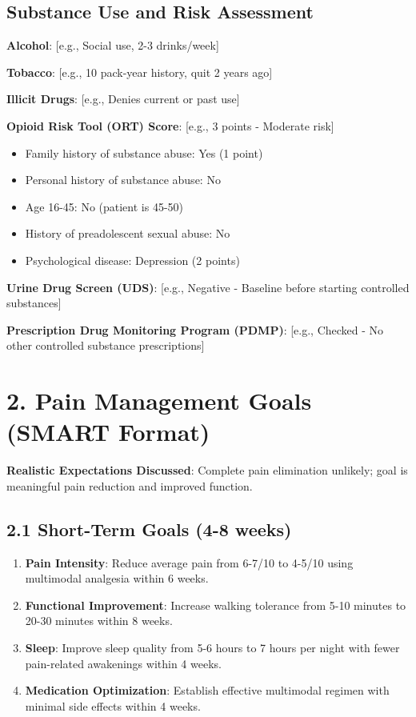 \documentclass[11pt,letterpaper]{article}
\begin{document}
\subsection*{Substance Use and Risk Assessment}

\textbf{Alcohol}: [e.g., Social use, 2-3 drinks/week]

\textbf{Tobacco}: [e.g., 10 pack-year history, quit 2 years ago]

\textbf{Illicit Drugs}: [e.g., Denies current or past use]

\textbf{Opioid Risk Tool (ORT) Score}: [e.g., 3 points - Moderate risk]
\begin{itemize}[leftmargin=*]
    \item Family history of substance abuse: Yes (1 point)
    \item Personal history of substance abuse: No
    \item Age 16-45: No (patient is 45-50)
    \item History of preadolescent sexual abuse: No
    \item Psychological disease: Depression (2 points)
\end{itemize}

\textbf{Urine Drug Screen (UDS)}: [e.g., Negative - Baseline before starting controlled substances]

\textbf{Prescription Drug Monitoring Program (PDMP)}: [e.g., Checked - No other controlled substance prescriptions]

\section*{2. Pain Management Goals (SMART Format)}

\textbf{Realistic Expectations Discussed}: Complete pain elimination unlikely; goal is meaningful pain reduction and improved function.

\subsection*{2.1 Short-Term Goals (4-8 weeks)}

\begin{enumerate}[leftmargin=*]
    \item \textbf{Pain Intensity}: Reduce average pain from 6-7/10 to 4-5/10 using multimodal analgesia within 6 weeks.

    \item \textbf{Functional Improvement}: Increase walking tolerance from 5-10 minutes to 20-30 minutes within 8 weeks.

    \item \textbf{Sleep}: Improve sleep quality from 5-6 hours to 7 hours per night with fewer pain-related awakenings within 4 weeks.

    \item \textbf{Medication Optimization}: Establish effective multimodal regimen with minimal side effects within 4 weeks.
\end{enumerate}
\end{document}
